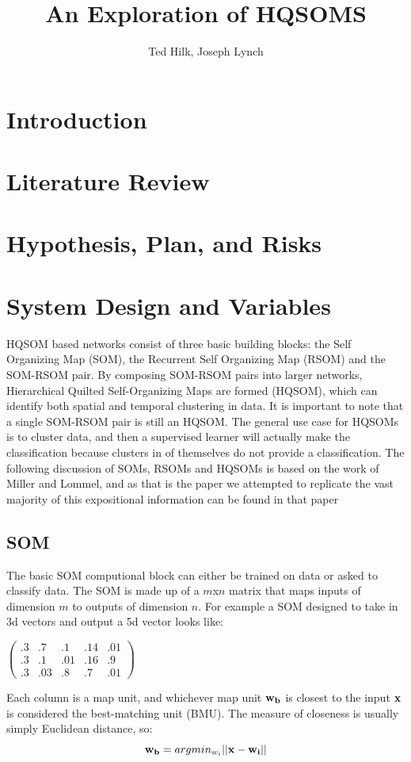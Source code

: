 \documentclass[a4paper,10pt]{article}
\title{An Exploration of HQSOMS}
\author{Ted Hilk, Joseph Lynch}
\begin{document}
\maketitle

\begin{abstract}

\end{abstract}

\section{Introduction}
\section{Literature Review}
\section{Hypothesis, Plan, and Risks}
\section{System Design and Variables}
HQSOM based networks consist of three basic building blocks: the Self Organizing Map (SOM), the
Recurrent Self Organizing Map (RSOM) and the SOM-RSOM pair.  By composing SOM-RSOM pairs
into larger networks, Hierarchical Quilted Self-Organizing Maps are formed (HQSOM), which can
identify both spatial and temporal clustering in data.  It is important to note that a single
SOM-RSOM pair is still an HQSOM. The general use case for HQSOMs is to cluster data, and then a
supervised learner will actually make the classification because clusters in of themselves do not
provide a classification. The following discussion of SOMs, RSOMs and HQSOMs is based on the work of
Miller and Lommel, and as that is the paper we attempted to replicate the vast majority of this
expositional information can be found in that paper
\cite{HQSOM}
\subsection{SOM}
The basic SOM computional block can either be trained on data or asked to classify data. The SOM is
made up of a $m$x$n$ matrix that maps inputs of dimension $m$ to outputs of dimension $n$.  For
example a SOM designed to take in 3d vectors and output a 5d vector looks like:

\begin{center}
$
\begin{pmatrix}
.3 & .7 & .1  & .14 & .01\\
.3 & .1 & .01 & .16 & .9\\
.3 & .03 & .8 & .7  & .01
\end{pmatrix}
$
\end{center}
Each column is a map unit, and whichever map unit $\bold{w_b}$ is closest to the input $\bold{x}$
is considered the best-matching unit (BMU).  The measure of closeness is usually simply Euclidean
distance, so:
\begin{equation}
 \bold{w_b} = argmin_{w_i} ||\bold{x} - \bold{w_i}||
\end{equation}
 
\end{document}
